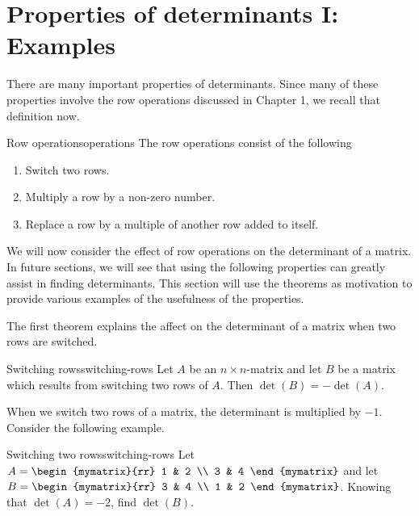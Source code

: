 \section{Properties of determinants I: Examples}

There are many important properties of determinants. Since many of
these properties involve the row operations discussed in Chapter 1, we recall that definition now.

\begin{definition}{Row operations}{operations}
  The row operations%
   consist of the following
                                           
  \begin{enumerate}                        
  \item Switch two rows.
                                           
  \item Multiply a row by a non-zero number.

  \item Replace a row by a multiple of another row added to itself.
  \end{enumerate}
\end{definition}

We will now consider the effect of row operations on the determinant
of a matrix. In future sections, we will see that using the following
properties can greatly assist in finding determinants. This section
will use the theorems as motivation to provide various examples of the
usefulness of the properties.

The first theorem explains the affect on the determinant of a matrix
when two rows are switched.

\begin{theorem}{Switching rows}{switching-rows}
  Let $A$ be an $n\times n$-matrix and let $B$ be a matrix which
  results from switching two rows of $A$. Then
  $\det (B) = - \det (A)$.
\end{theorem}

When we switch two rows of a matrix, the determinant is multiplied by
$-1$. Consider the following example.

\begin{example}{Switching two rows}{switching-rows}
  Let $A=\begin{mymatrix}{rr}
    1 & 2 \\
    3 & 4
  \end{mymatrix} $ and let $B=\begin{mymatrix}{rr}
    3 & 4 \\
    1 & 2
  \end{mymatrix}$. 
  Knowing that $\det (A) =-2$, find $\det (B)$.
\end{example}

